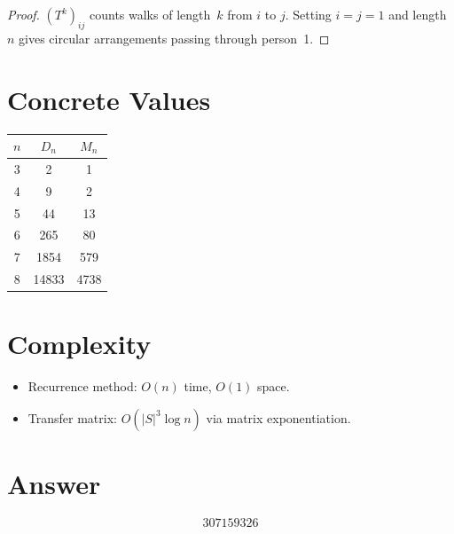 \documentclass[11pt]{article}
\begin{document}
\begin{proof}
$(T^k)_{ij}$ counts walks of length~$k$ from $i$ to $j$. Setting $i = j = 1$ and length $n$ gives circular arrangements passing through person~1.
\end{proof}

\section{Concrete Values}

\begin{center}
\begin{tabular}{ccc}
\toprule
$n$ & $D_n$ & $M_n$ \\
\midrule
3 & 2 & 1 \\
4 & 9 & 2 \\
5 & 44 & 13 \\
6 & 265 & 80 \\
7 & 1854 & 579 \\
8 & 14833 & 4738 \\
\bottomrule
\end{tabular}
\end{center}

\section{Complexity}

\begin{itemize}
\item Recurrence method: $O(n)$ time, $O(1)$ space.
\item Transfer matrix: $O(|S|^3 \log n)$ via matrix exponentiation.
\end{itemize}

\section{Answer}

\[
\boxed{307159326}
\]
\end{document}
